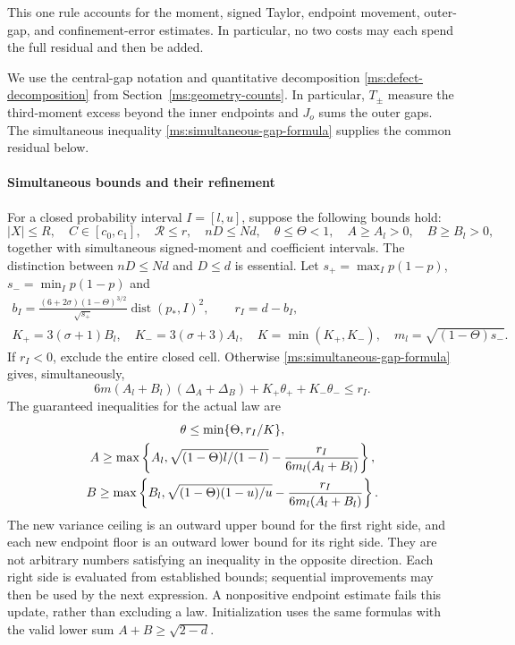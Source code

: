 This one rule accounts for the moment, signed Taylor, endpoint movement,
outer-gap, and confinement-error estimates. In particular, no two costs
may each spend the full residual and then be added.

We use the central-gap notation and quantitative decomposition
\eqref{ms:defect-decomposition} from Section~\ref{ms:geometry-counts}.
In particular, $T_\pm$ measure the third-moment excess beyond the inner
endpoints and $J_o$ sums the outer gaps. The simultaneous inequality
\eqref{ms:simultaneous-gap-formula} supplies the common residual below.

\paragraph{Simultaneous bounds and their refinement}
For a closed probability interval $I=[l,u]$, suppose the following bounds hold:
\[
 |X|\le R,\quad C\in[c_0,c_1],\quad\mathcal R\le r,
 \quad nD\le Nd,\quad\theta\le\Theta<1,
 \quad A\ge A_l>0,\quad B\ge B_l>0,
\]
together with simultaneous signed-moment and coefficient intervals.
The distinction between $nD\le Nd$ and $D\le d$ is essential.
Let $s_+=\max_Ip(1-p)$, $s_-=\min_Ip(1-p)$ and
\begin{gather*}
 b_I=\frac{(6+2\sigma)(1-\Theta)^{3/2}}{\sqrt{s_+}}
                 \operatorname{dist}(p_*,I)^2,
 \qquad r_I=d-b_I,\\
 K_+=3(\sigma+1)B_l,\quad K_-=3(\sigma+3)A_l,
 \quad K=\min(K_+,K_-),\quad m_l=\sqrt{(1-\Theta)s_-}.
\end{gather*}
If $r_I<0$, exclude the entire closed cell. Otherwise \eqref{ms:simultaneous-gap-formula}
gives, simultaneously,
\begin{equation}\label{ms:fourier:rescore:re-residual}
 6m(A_l+B_l)(\Delta_A+\Delta_B)+K_+\theta_++K_-\theta_-\le r_I.
\end{equation}
The guaranteed inequalities for the actual law are
\begin{gather}
 \theta\le\min\{\Theta,r_I/K\},\notag\\
 A\ge\max\left\{A_l,\sqrt{(1-\Theta)l/(1-l)}-
                  \frac{r_I}{6m_l(A_l+B_l)}\right\},\notag\\
 B\ge\max\left\{B_l,\sqrt{(1-\Theta)(1-u)/u}-
                  \frac{r_I}{6m_l(A_l+B_l)}\right\}.
 \label{ms:fourier:rescore:re-geometry}
\end{gather}
The new variance ceiling is an outward upper bound for the first
right side, and each new endpoint floor is an outward lower bound for its
right side. They are not arbitrary numbers satisfying an inequality in
the opposite direction.
Each right side is evaluated from established bounds; sequential
improvements may then be used by the next expression. A nonpositive
endpoint estimate fails this update, rather than excluding a law.
Initialization uses the same formulas with the valid lower sum
$A+B\ge\sqrt{2-d}$.

